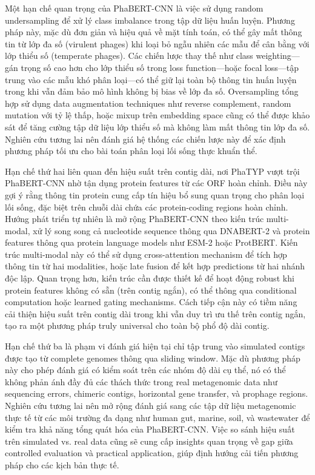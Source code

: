 Một hạn chế quan trọng của PhaBERT-CNN là việc sử dụng random undersampling để xử lý class imbalance trong tập dữ liệu huấn luyện. Phương pháp này, mặc dù đơn giản và hiệu quả về mặt tính toán, có thể gây mất thông tin từ lớp đa số (virulent phages) khi loại bỏ ngẫu nhiên các mẫu để cân bằng với lớp thiểu số (temperate phages). Các chiến lược thay thế như class weighting—gán trọng số cao hơn cho lớp thiểu số trong loss function—hoặc focal loss—tập trung vào các mẫu khó phân loại—có thể giữ lại toàn bộ thông tin huấn luyện trong khi vẫn đảm bảo mô hình không bị bias về lớp đa số. Oversampling tổng hợp sử dụng data augmentation techniques như reverse complement, random mutation với tỷ lệ thấp, hoặc mixup trên embedding space cũng có thể được khảo sát để tăng cường tập dữ liệu lớp thiểu số mà không làm mất thông tin lớp đa số. Nghiên cứu tương lai nên đánh giá hệ thống các chiến lược này để xác định phương pháp tối ưu cho bài toán phân loại lối sống thực khuẩn thể.

Hạn chế thứ hai liên quan đến hiệu suất trên contig dài, nơi PhaTYP vượt trội PhaBERT-CNN nhờ tận dụng protein features từ các ORF hoàn chỉnh. Điều này gợi ý rằng thông tin protein cung cấp tín hiệu bổ sung quan trọng cho phân loại lối sống, đặc biệt trên chuỗi dài chứa các protein-coding regions hoàn chỉnh. Hướng phát triển tự nhiên là mở rộng PhaBERT-CNN theo kiến trúc multi-modal, xử lý song song cả nucleotide sequence thông qua DNABERT-2 và protein features thông qua protein language models như ESM-2 hoặc ProtBERT. Kiến trúc multi-modal này có thể sử dụng cross-attention mechanism để tích hợp thông tin từ hai modalities, hoặc late fusion để kết hợp predictions từ hai nhánh độc lập. Quan trọng hơn, kiến trúc cần được thiết kế để hoạt động robust khi protein features không có sẵn (trên contig ngắn), có thể thông qua conditional computation hoặc learned gating mechanisms. Cách tiếp cận này có tiềm năng cải thiện hiệu suất trên contig dài trong khi vẫn duy trì ưu thế trên contig ngắn, tạo ra một phương pháp truly universal cho toàn bộ phổ độ dài contig.

Hạn chế thứ ba là phạm vi đánh giá hiện tại chỉ tập trung vào simulated contigs được tạo từ complete genomes thông qua sliding window. Mặc dù phương pháp này cho phép đánh giá có kiểm soát trên các nhóm độ dài cụ thể, nó có thể không phản ánh đầy đủ các thách thức trong real metagenomic data như sequencing errors, chimeric contigs, horizontal gene transfer, và prophage regions. Nghiên cứu tương lai nên mở rộng đánh giá sang các tập dữ liệu metagenomic thực tế từ các môi trường đa dạng như human gut, marine, soil, và wastewater để kiểm tra khả năng tổng quát hóa của PhaBERT-CNN. Việc so sánh hiệu suất trên simulated vs. real data cũng sẽ cung cấp insights quan trọng về gap giữa controlled evaluation và practical application, giúp định hướng cải tiến phương pháp cho các kịch bản thực tế.

